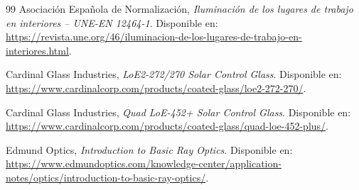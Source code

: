 \documentclass[12pt,a4paper]{article}
\begin{document}
\begin{thebibliography}{99}
Asociación Española de Normalización, \textit{Iluminación de los lugares de trabajo en interiores -- UNE-EN 12464-1}. Disponible en: \url{https://revista.une.org/46/iluminacion-de-los-lugares-de-trabajo-en-interiores.html}.

Cardinal Glass Industries, \textit{LoE2-272/270 Solar Control Glass}. Disponible en: \url{https://www.cardinalcorp.com/products/coated-glass/loe2-272-270/}.

Cardinal Glass Industries, \textit{Quad LoE-452+ Solar Control Glass}. Disponible en: \url{https://www.cardinalcorp.com/products/coated-glass/quad-loe-452-plus/}.

Edmund Optics, \textit{Introduction to Basic Ray Optics}. Disponible en: \url{https://www.edmundoptics.com/knowledge-center/application-notes/optics/introduction-to-basic-ray-optics/}.

\end{thebibliography}
\end{document}
